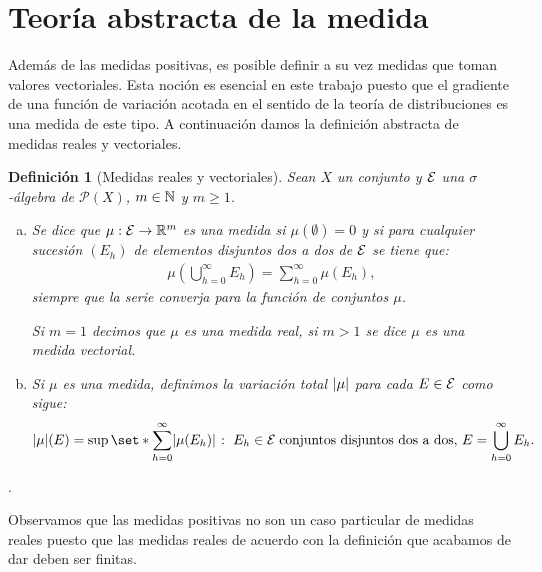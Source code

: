 \documentclass[a4paper,11pt,spanish, twoside, leqno]{tfm-uam}
\newtheorem{defi}[teo]{Definición}
\begin{document}
\section{Teoría abstracta de la medida}

Además de las medidas positivas, es posible definir a su vez medidas que toman valores vectoriales. Esta noción es esencial en este trabajo puesto que el gradiente de una función de variación acotada en el sentido de la teoría de distribuciones es una medida de este tipo. A continuación damos la definición abstracta de medidas reales y vectoriales.
\begin{defi}[Medidas reales y vectoriales]   
Sean $X$ un conjunto y $\mathcal{E}$  una $\sigma$-álgebra de $\mathcal{P}(X)$, $m\in \mathbb{N}$ y $m\geq 1$.
\begin{enumerate}[(a)]
\item Se dice que $\mu: \mathcal{E}\to \mathbb{R}^{m}$ es una medida si $\mu(\emptyset)=0$ y si para cualquier sucesión $(E_{h})$ de elementos disjuntos dos a dos de $\mathcal{E}$ se tiene que:
\begin{align*}
\mu\left( \bigcup_{h=0}^{\infty}E_{h}\right)=\sum_{h=0}^{\infty}\mu(E_{h}),
\end{align*}
siempre que la serie converja para la función de conjuntos $\mu$.

Si $m=1$ decimos que $\mu$ es una medida real, si $m>1$ se dice $\mu$ es una medida vectorial. 
\item Si $\mu$ es una medida, definimos la variación total $\lvert\mu\rvert$ para cada $E\in \mathcal{E}$ como sigue:
\begin{align*}
\abs{\mu}(E)=\sup\set*{\sum^{\infty}_{h=0}\abs{\mu(E_{h})}\given E_{h}\in \E\; \text{conjuntos disjuntos dos a dos},\, E=\bigcup_{h=0}^{\infty}E_{h}}.
\end{align*}
\end{enumerate}
\end{defi}.

Observamos que las medidas positivas no son un caso particular de medidas reales puesto que las medidas reales de acuerdo con la definición que acabamos de dar deben ser finitas.
\end{document}
